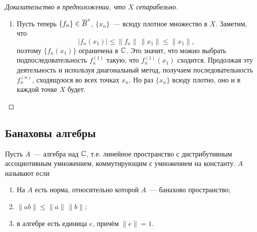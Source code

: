 \documentclass{notes}
\newcommand{\ssph}{\ov{B}^*}
\begin{document}
\begin{thm}
\begin{proof}[Доказательство в предположении, что $X$ сепарабельно]
\begin{enumerate}
				Поскольку множество $\{x_n\}$ плотное, для каждого $y_k$ найдётся $x_{i_k}$ такой, что
				\[
					\|y_k - x_{i_k}\| < \dfrac{\varepsilon}{3\big(1 + \|f_0\|\big)}.
				\]
				Положим $\delta = \tfrac{\varepsilon}{3}$ и рассмотрим $f \in U_{\delta} \cap \ssph$. Проверим, лежит ли $f$ в $V_{\varepsilon}$:
				\begin{align*}
					\big|f(y_k) - f_0(y_k)\big| &= \big|f(y_k) - f(x_{i_k}) + f(x_{i_k}) - f_0(x_{i_k}) + f_0(x_{i_k}) - f_0(y_k)\big| \leqslant \\ 
					&\leqslant \big|f(y_k) - f(x_{i_k})\big| + \big|f(x_{i_k}) - f_0(x_{i_k})\big| + \big|f_0(x_{i_k}) - f_0(y_k)\big| \leqslant \\
					&\leqslant \underbrace{\|f\| \, \|y_k - x_{i_k}\|}_{<\dfrac{\varepsilon}{3\big(1 + \|f_0\|\big)}} + \underbrace{\big|f(x_{i_k}) - f_0(x_{i_k})\big|}_{\leqslant\dfrac{\varepsilon}{3}} + \|f_0\| \, \underbrace{\|x_{i_k} - y_k\|}_{\mathclap{<\dfrac{\varepsilon}{3\big(1 + \|f_0\|\big)}}} < \varepsilon.
				\end{align*}
				Успех!
				\item Пусть теперь $\{f_n\} \in \ssph$, $\{x_n\}$~--- всюду плотное множество в $X$. Заметим, что
				\[
					\big|f_n(x_1)\big| \leqslant \|f_n\| \, \|x_1\| \leqslant \|x_1\|,
				\]
				поэтому $\big\{f_n(x_1)\big\}$ ограничена в $\mathbb{C}$. Это значит, что можно выбрать подпоследовательность $f_n^{(1)}$ такую, что $f_n^{(1)}(x_1)$ сходится. Продолжая эту деятельность и используя диагональный метод, получаем последовательность $f_n^{(n)}$, сходящуюся во всех точках $x_n$. Но раз $\{x_n\}$ всюду плотно, оно и в каждой точке $X$ будет.
			\end{enumerate}
		\end{proof}
	\end{thm}

\subsection{Банаховы алгебры}

	\begin{de}
		Пусть $A$~--- алгебра над $\mathbb{C}$, т.е. линейное пространство с дистрибутивным ассоциотивным умножением, коммутирующим с умножением на константу. $A$ называют  если 
		\begin{enumerate}
			\item На $A$ есть норма, относительно которой $A$~--- банахово пространство;
			\item $\|ab\| \leqslant \|a\|\,\|b\|$;
			\item в алгебре есть единица $e$, причём $\|e\| = 1$.
		\end{enumerate}
	\end{de}
\end{document}
